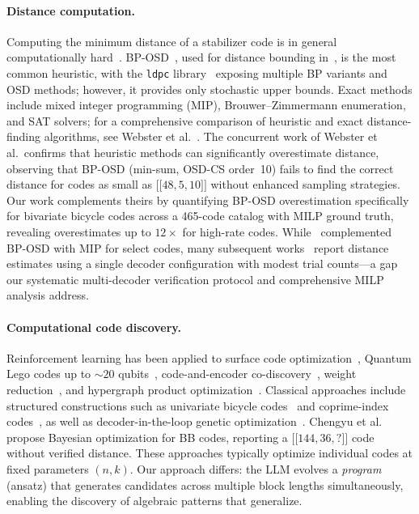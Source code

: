 \documentclass[aps,prxquantum,twocolumn,superscriptaddress,nofootinbib]{revtex4-2}
\newcommand{\dblbrk}[1]{\ensuremath{\lbrack\!\lbrack #1 \rbrack\!\rbrack}}
\newcommand{\code}[1]{\dblbrk{#1}}
\begin{document}
\paragraph{Distance computation.}
Computing the minimum distance of a stabilizer code is in general computationally hard~\cite{kapshikar2022hardness}.
BP-OSD~\cite{roffe2020decoding,panteleev2021degenerate}, used for distance bounding in~\cite{bravyi2024high}, is the most common heuristic, with the \texttt{ldpc} library~\cite{ldpc_library} exposing multiple BP variants and OSD methods; however, it provides only stochastic upper bounds.
Exact methods include mixed integer programming (MIP), Brouwer--Zimmermann enumeration, and SAT solvers; for a comprehensive comparison of heuristic and exact distance-finding algorithms, see Webster et al.~\cite{webster2026distance}.
The concurrent work of Webster et al.\ confirms that heuristic methods can significantly overestimate distance, observing that BP-OSD (min-sum, OSD-CS order~10) fails to find the correct distance for codes as small as $\code{48,5,10}$ without enhanced sampling strategies.
Our work complements theirs by quantifying BP-OSD overestimation specifically for bivariate bicycle codes across a 465-code catalog with MILP ground truth, revealing overestimates up to $12\times$ for high-rate codes.
While~\cite{bravyi2024high} complemented BP-OSD with MIP for select codes, many subsequent works~\cite{wang2024coprime,chengyu2026bayesian} report distance estimates using a single decoder configuration with modest trial counts---a gap our systematic multi-decoder verification protocol and comprehensive MILP analysis address.

\paragraph{Computational code discovery.}
Reinforcement learning has been applied to surface code optimization~\cite{nautrup2019optimizing}, Quantum Lego codes up to ${\sim}20$ qubits~\cite{su2025discovery}, code-and-encoder co-discovery~\cite{olle2024simultaneous}, weight reduction~\cite{he2025discovering}, and hypergraph product optimization~\cite{freire2025optimizing}.
Classical approaches include structured constructions such as univariate bicycle codes~\cite{rabeti2025list} and coprime-index codes~\cite{wang2024coprime}, as well as decoder-in-the-loop genetic optimization~\cite{elkelesh2019decoder}.
Chengyu et al.~\cite{chengyu2026bayesian} propose Bayesian optimization for BB codes, reporting a $\code{144,36,?}$ code without verified distance.
These approaches typically optimize individual codes at fixed parameters $(n,k)$.
Our approach differs: the LLM evolves a \emph{program} (ansatz) that generates candidates across multiple block lengths simultaneously, enabling the discovery of algebraic patterns that generalize. 
\end{document}
